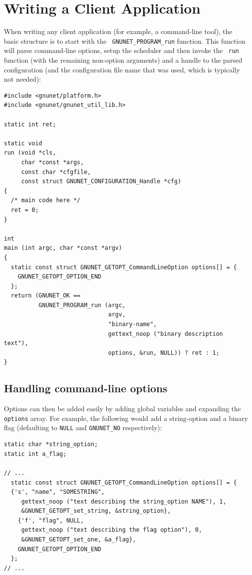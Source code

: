 \documentclass[10pt]{article}
\begin{document}
\section{Writing a Client Application}

When writing any client application (for example, a command-line
tool), the basic structure is to start with the {\tt
  GNUNET\_PROGRAM\_run} function.  This function will parse
command-line options, setup the scheduler and then invoke the {\tt
  run} function (with the remaining non-option arguments) and a handle
to the parsed configuration (and the configuration file name that was
used, which is typically not needed):

\lstset{language=c}
\begin{lstlisting}
#include <gnunet/platform.h>
#include <gnunet/gnunet_util_lib.h>

static int ret;

static void
run (void *cls,
     char *const *args,
     const char *cfgfile,
     const struct GNUNET_CONFIGURATION_Handle *cfg)
{
  /* main code here */
  ret = 0;
}

int
main (int argc, char *const *argv)
{
  static const struct GNUNET_GETOPT_CommandLineOption options[] = {
    GNUNET_GETOPT_OPTION_END
  };
  return (GNUNET_OK ==
          GNUNET_PROGRAM_run (argc,
                              argv,
                              "binary-name",
                              gettext_noop ("binary description text"),
                              options, &run, NULL)) ? ret : 1;
}
\end{lstlisting}

\subsection{Handling command-line options}

Options can then be added easily by adding global variables and
expanding the {\tt options} array.  For example, the following would
add a string-option and a binary flag (defaulting to {\tt NULL} and
{\tt GNUNET\_NO} respectively):

\begin{lstlisting}
static char *string_option;
static int a_flag;

// ...
  static const struct GNUNET_GETOPT_CommandLineOption options[] = {
  {'s', "name", "SOMESTRING",
     gettext_noop ("text describing the string_option NAME"), 1,
     &GNUNET_GETOPT_set_string, &string_option},
    {'f', "flag", NULL,
     gettext_noop ("text describing the flag option"), 0,
     &GNUNET_GETOPT_set_one, &a_flag},
    GNUNET_GETOPT_OPTION_END
  };
// ...
\end{lstlisting}
\end{document}
